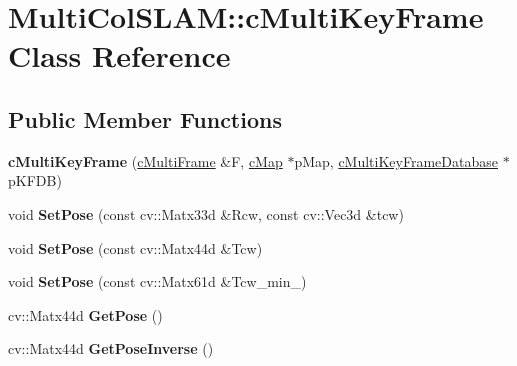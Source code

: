 \hypertarget{classMultiColSLAM_1_1cMultiKeyFrame}{}\section{Multi\+Col\+S\+L\+AM\+:\+:c\+Multi\+Key\+Frame Class Reference}
\label{classMultiColSLAM_1_1cMultiKeyFrame}
\subsection*{Public Member Functions}
\begin{DoxyCompactItemize}
\item 
{\bfseries c\+Multi\+Key\+Frame} (\hyperlink{classMultiColSLAM_1_1cMultiFrame}{c\+Multi\+Frame} \&F, \hyperlink{classMultiColSLAM_1_1cMap}{c\+Map} $\ast$p\+Map, \hyperlink{classMultiColSLAM_1_1cMultiKeyFrameDatabase}{c\+Multi\+Key\+Frame\+Database} $\ast$p\+K\+F\+DB)\hypertarget{classMultiColSLAM_1_1cMultiKeyFrame_abf8a1aaf639f652a3ae497286c62ae02}{}\label{classMultiColSLAM_1_1cMultiKeyFrame_abf8a1aaf639f652a3ae497286c62ae02}

\item 
void {\bfseries Set\+Pose} (const cv\+::\+Matx33d \&Rcw, const cv\+::\+Vec3d \&tcw)\hypertarget{classMultiColSLAM_1_1cMultiKeyFrame_a590b95612532d4d987876716f2b9e79d}{}\label{classMultiColSLAM_1_1cMultiKeyFrame_a590b95612532d4d987876716f2b9e79d}

\item 
void {\bfseries Set\+Pose} (const cv\+::\+Matx44d \&Tcw)\hypertarget{classMultiColSLAM_1_1cMultiKeyFrame_a5fca1cb5acc6d30d1522a2f5d5d88002}{}\label{classMultiColSLAM_1_1cMultiKeyFrame_a5fca1cb5acc6d30d1522a2f5d5d88002}

\item 
void {\bfseries Set\+Pose} (const cv\+::\+Matx61d \&Tcw\+\_\+min\+\_\+)\hypertarget{classMultiColSLAM_1_1cMultiKeyFrame_a0dc7e6c9420751bc76110471113bddae}{}\label{classMultiColSLAM_1_1cMultiKeyFrame_a0dc7e6c9420751bc76110471113bddae}

\item 
cv\+::\+Matx44d {\bfseries Get\+Pose} ()\hypertarget{classMultiColSLAM_1_1cMultiKeyFrame_aa2d23171b24baa6fd816dc0723b6b664}{}\label{classMultiColSLAM_1_1cMultiKeyFrame_aa2d23171b24baa6fd816dc0723b6b664}

\item 
cv\+::\+Matx44d {\bfseries Get\+Pose\+Inverse} ()\hypertarget{classMultiColSLAM_1_1cMultiKeyFrame_a4844cdf390745655a8357c566a0a2c60}{}\label{classMultiColSLAM_1_1cMultiKeyFrame_a4844cdf390745655a8357c566a0a2c60}


\end{DoxyCompactItemize}
